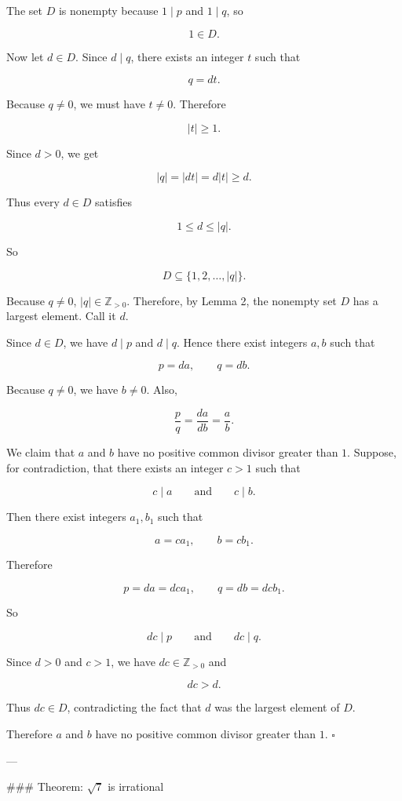 The set \(D\) is nonempty because \(1\mid p\) and \(1\mid q\), so

\[
1\in D.
\]

Now let \(d\in D\). Since \(d\mid q\), there exists an integer \(t\) such that

\[
q=dt.
\]

Because \(q\neq 0\), we must have \(t\neq 0\). Therefore

\[
|t|\ge 1.
\]

Since \(d>0\), we get

\[
|q|=|dt|=d|t|\ge d.
\]

Thus every \(d\in D\) satisfies

\[
1\le d\le |q|.
\]

So

\[
D\subseteq \{1,2,\dots,|q|\}.
\]

Because \(q\neq 0\), \(|q|\in\mathbb Z_{>0}\). Therefore, by Lemma 2, the nonempty set \(D\) has a largest element. Call it \(d\).

Since \(d\in D\), we have \(d\mid p\) and \(d\mid q\). Hence there exist integers \(a,b\) such that

\[
p=da,\qquad q=db.
\]

Because \(q\neq 0\), we have \(b\neq 0\). Also,

\[
\frac{p}{q}=\frac{da}{db}=\frac{a}{b}.
\]

We claim that \(a\) and \(b\) have no positive common divisor greater than \(1\). Suppose, for contradiction, that there exists an integer \(c>1\) such that

\[
c\mid a
\qquad\text{and}\qquad
c\mid b.
\]

Then there exist integers \(a_1,b_1\) such that

\[
a=ca_1,\qquad b=cb_1.
\]

Therefore

\[
p=da=dca_1,
\qquad
q=db=dcb_1.
\]

So

\[
dc\mid p
\qquad\text{and}\qquad
dc\mid q.
\]

Since \(d>0\) and \(c>1\), we have \(dc\in\mathbb Z_{>0}\) and

\[
dc>d.
\]

Thus \(dc\in D\), contradicting the fact that \(d\) was the largest element of \(D\).

Therefore \(a\) and \(b\) have no positive common divisor greater than \(1\). \(\square\)

---

### Theorem: \(\sqrt 7\) is irrational

